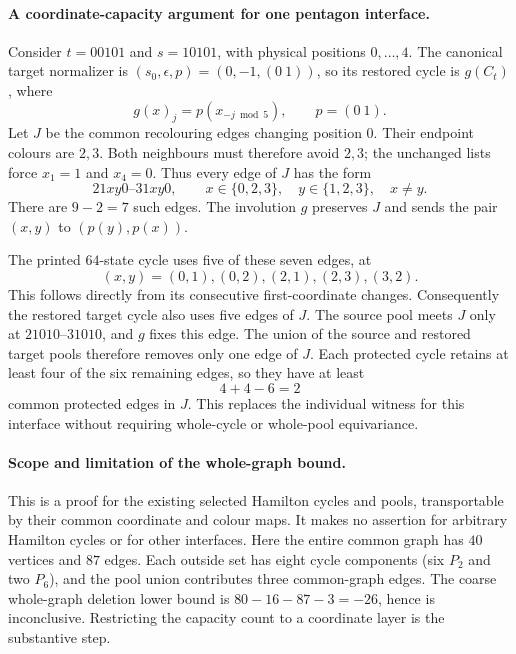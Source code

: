 \paragraph{A coordinate-capacity argument for one pentagon interface.}
Consider $t=00101$ and $s=10101$, with physical positions $0,\ldots,4$.
The canonical target normalizer is $(s_0,\epsilon,p)=(0,-1,(0\ 1))$,
so its restored cycle is $g(C_t)$, where
\[
 g(x)_j=p(x_{-j\bmod5}),\qquad p=(0\ 1).
\]
Let $J$ be the common recolouring edges changing position $0$.
Their endpoint colours are $2,3$. Both neighbours must therefore
avoid $2,3$; the unchanged lists force $x_1=1$ and $x_4=0$.
Thus every edge of $J$ has the form
\[
 21xy0\text{--}31xy0,\qquad
 x\in\{0,2,3\},\quad y\in\{1,2,3\},\quad x\ne y.
\]
There are $9-2=7$ such edges. The involution $g$ preserves $J$ and
sends the pair $(x,y)$ to $(p(y),p(x))$.

The printed $64$-state cycle uses five of these seven edges, at
\[
(x,y)=(0,1),(0,2),(2,1),(2,3),(3,2).
\]
This follows directly from its consecutive first-coordinate changes.
Consequently the restored target cycle also uses five edges of $J$.
The source pool meets $J$ only at $21010$--$31010$, and $g$ fixes
this edge. The union of the source and restored target pools therefore
removes only one edge of $J$. Each protected cycle retains at least
four of the six remaining edges, so they have at least
\[
 4+4-6=2
\]
common protected edges in $J$. This replaces the individual witness
for this interface without requiring whole-cycle or whole-pool
equivariance.

\paragraph{Scope and limitation of the whole-graph bound.}
This is a proof for the existing selected Hamilton cycles and pools,
transportable by their common coordinate and colour maps. It makes no
assertion for arbitrary Hamilton cycles or for other interfaces.
Here the entire common graph has $40$ vertices and $87$ edges.
Each outside set has eight cycle components (six $P_2$ and two $P_6$),
and the pool union contributes three common-graph edges. The coarse
whole-graph deletion lower bound is
$80-16-87-3=-26$, hence is inconclusive. Restricting the capacity count
to a coordinate layer is the substantive step.

